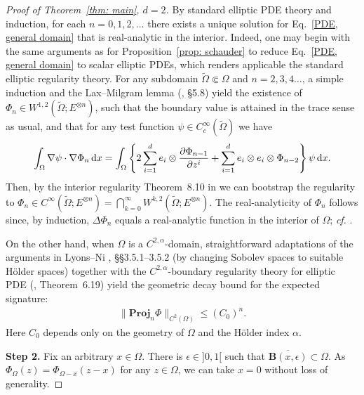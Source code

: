 \documentclass[11pt,a4paper,english,reqno]{amsart}
\theoremstyle{plain}
\newcommand{\na}{\nabla}
\newcommand{\dd}{{\rm d}}
\newcommand{\p}{\partial}
\newcommand{\e}{\epsilon}
\newcommand{\1}{\mathbbm{1}}
\newcommand{\B}{\mathbf{B}}
\newcommand{\proj}{\mathbf{Proj}}
\begin{document}
\begin{proof}[Proof of Theorem~\ref{thm: main}, $d=2$]
By standard elliptic PDE theory and induction, for each $n=0,1,2,\ldots$ there exists a unique solution for Eq.~\eqref{PDE, general domain} that is real-analytic in the interior. Indeed, one may begin with the same arguments as for Proposition~\ref{prop: schauder} to reduce Eq.~\eqref{PDE, general domain} to scalar elliptic PDEs, which renders  applicable the standard elliptic regularity theory. For any subdomain  $\widetilde{\Omega} \Subset \Omega$ and  $n=2,3,4\ldots$, a simple induction and the Lax--Milgram lemma (\cite{gt}, \S 5.8) yield the existence of $\Phi_n \in W^{1,2}\left(\widetilde{\Omega}; E^{\otimes n}\right)$, such that the boundary value is attained in the trace sense as usual, and that for any test function $\psi \in C^\infty_c\left(\widetilde{\Omega}\right)$ we have
\begin{align*}
    \int_\Omega \na\psi \cdot \na \Phi_n\,\dd x = \int_\Omega \left\{ 2 \sum_{i=1}^d e_i \otimes \frac{\p  \Phi_{n-1}}{\p z^i} + \sum_{i=1}^d e_i \otimes e_i \otimes\Phi_{n-2}\right\}\psi \,\dd x.
\end{align*}
Then, by the interior regularity Theorem~8.10 in \cite{gt} we can bootstrap the regularity to $\Phi_n \in C^{\infty}\left(\widetilde{\Omega}; E^{\otimes n}\right) = \bigcap_{k=0}^\infty W^{k,2}\left(\widetilde{\Omega}; E^{\otimes n}\right)$. The real-analyticity of $\Phi_n$ follows since, by induction,  $\Delta \Phi_n $ equals a real-analytic function in the interior of $\Omega$; \emph{cf.} \cite{john}. 

On the other hand, when $\Omega$ is a $C^{2,\alpha}$-domain,  straightforward adaptations of the arguments in Lyons--Ni \cite{lyons2015expected}, \S\S 3.5.1--3.5.2 (by changing Sobolev spaces to suitable H\"{o}lder spaces) together with the $C^{2,\alpha}$-boundary regularity theory for elliptic PDE (\cite{gt}, Theorem~6.19)  yield the geometric decay bound for the expected signature:
\begin{align*}
\|\proj_n \Phi\|_{C^2(\Omega)} \leq (C_0)^n.
\end{align*}
Here $C_0$ depends only on the geometry of $\Omega$ and the H\"{o}lder index $\alpha$.



\smallskip
\noindent
{\bf Step 2.} Fix an arbitrary $x \in \Omega$. There is $\e \in ]0,1[$ such that $\overline{\B(x,\e)} \subset \Omega$. As  $\Phi_{\Omega}(z) = \Phi_{\Omega-x}(z-x)$ for any $z\in\Omega$, we can take $x = 0$ without loss of generality.


\end{proof}
\end{document}
